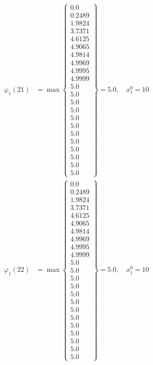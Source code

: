 \documentclass{article}
\begin{document}
\begin{align*}
\varphi_{1}(21) &= \max \left\{ \begin{array}{c}
0.0 \\
 0.2489 \\
 1.9824 \\
 3.7371 \\
 4.6125 \\
 4.9065 \\
 4.9814 \\
 4.9969 \\
 4.9995 \\
 4.9999 \\
 5.0 \\
 5.0 \\
 5.0 \\
 5.0 \\
 5.0 \\
 5.0 \\
 5.0 \\
 5.0 \\
 5.0 \\
 5.0 \\
 5.0 \\
 5.0
\end{array} \right\}=5.0, \quad x_{1}^0=10\\
  
\varphi_{1}(22) &= \max \left\{ \begin{array}{c}
0.0 \\
 0.2489 \\
 1.9824 \\
 3.7371 \\
 4.6125 \\
 4.9065 \\
 4.9814 \\
 4.9969 \\
 4.9995 \\
 4.9999 \\
 5.0 \\
 5.0 \\
 5.0 \\
 5.0 \\
 5.0 \\
 5.0 \\
 5.0 \\
 5.0 \\
 5.0 \\
 5.0 \\
 5.0 \\
 5.0 \\
 5.0
\end{array} \right\}=5.0, \quad x_{1}^0=10\\
  

\end{align*}
\end{document}
